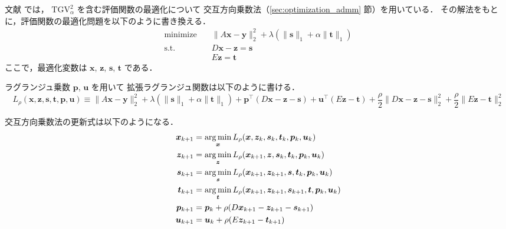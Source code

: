 文献 \cite{Li2016} では，
$\mathrm{TGV}_{\alpha}^2$ を含む評価関数の最適化について
交互方向乗数法（\ref{sec:optimization_admm} 節）を用いている．
その解法をもとに，評価関数の最適化問題を以下のように書き換える．
\begin{equation}
    \begin{aligned}
        \text{minimize} \hspace{1em} & \|A \bm{x} - \bm{y}\|_2^2
        + \lambda \left( \|\bm{s}\|_1 + \alpha \|\bm{t}\|_1 \right)
        \\
        \text{s.t.} \hspace{1em}     & D \bm{x} - \bm{z} = \bm{s} \\
                                     & E \bm{z} = \bm{t}
    \end{aligned}
\end{equation}
ここで，最適化変数は $\bm{x}$, $\bm{z}$, $\bm{s}$, $\bm{t}$ である．

ラグランジュ乗数 $\bm{p}$, $\bm{u}$ を用いて
拡張ラグランジュ関数は以下のように書ける．
\begin{equation}
    L_{\rho}(\bm{x}, \bm{z}, \bm{s}, \bm{t}, \bm{p}, \bm{u})
    \equiv
    \|A \bm{x} - \bm{y}\|_2^2
    + \lambda \left( \|\bm{s}\|_1 + \alpha \|\bm{t}\|_1 \right)
    + \bm{p}^\top (D \bm{x} - \bm{z} - \bm{s})
    + \bm{u}^\top (E \bm{z} - \bm{t})
    + \frac{\rho}{2} \|D \bm{x} - \bm{z} - \bm{s}\|_2^2
    + \frac{\rho}{2} \|E \bm{z} - \bm{t}\|_2^2
\end{equation}

交互方向乗数法の更新式は以下のようになる．
\begin{align}
    \bm{x}_{k+1} & = \operatorname*{arg \thinspace min}_{\bm{x}}
    L_{\rho}(\bm{x}, \bm{z}_k, \bm{s}_k, \bm{t}_k, \bm{p}_k, \bm{u}_k)
    \\
    \bm{z}_{k+1} & = \operatorname*{arg \thinspace min}_{\bm{z}}
    L_{\rho}(\bm{x}_{k+1}, \bm{z}, \bm{s}_k, \bm{t}_k, \bm{p}_k, \bm{u}_k)
    \\
    \bm{s}_{k+1} & = \operatorname*{arg \thinspace min}_{\bm{s}}
    L_{\rho}(\bm{x}_{k+1}, \bm{z}_{k+1}, \bm{s}, \bm{t}_k, \bm{p}_k, \bm{u}_k)
    \\
    \bm{t}_{k+1} & = \operatorname*{arg \thinspace min}_{\bm{t}}
    L_{\rho}(\bm{x}_{k+1}, \bm{z}_{k+1}, \bm{s}_{k+1}, \bm{t}, \bm{p}_k, \bm{u}_k)
    \\
    \bm{p}_{k+1} & = \bm{p}_k + \rho (D \bm{x}_{k+1} - \bm{z}_{k+1} - \bm{s}_{k+1})
    \\
    \bm{u}_{k+1} & = \bm{u}_k + \rho (E \bm{z}_{k+1} - \bm{t}_{k+1})
\end{align}


